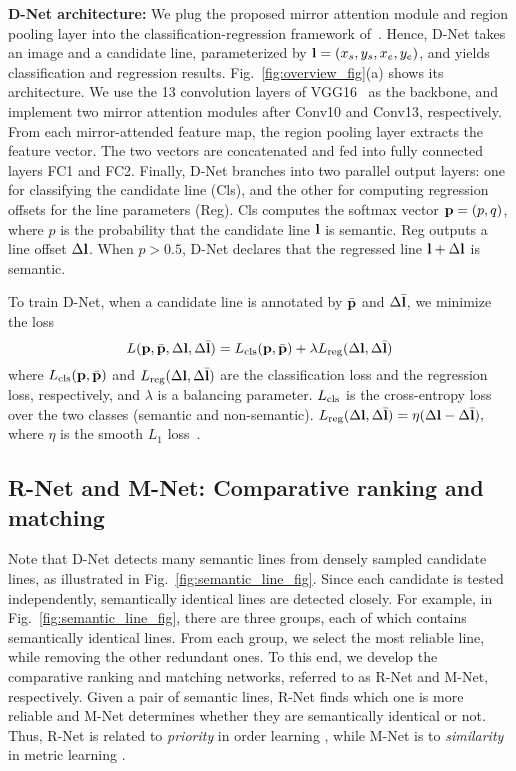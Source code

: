 \documentclass[runningheads]{llncs}
\begin{document}
\noindent\textbf{D-Net architecture:} We plug the proposed mirror attention module and region pooling layer into the classification-regression framework of~\cite{lee2017}. Hence, D-Net takes an image and a candidate line, parameterized by ${\bf l} = (x_s, y_s, x_e, y_e)$, and yields classification and regression results. Fig.~\ref{fig:overview_fig}(a) shows its architecture. We use the 13 convolution layers of VGG16~\cite{Simonyan2015} as the backbone, and implement two mirror attention modules after Conv10 and Conv13, respectively. From each mirror-attended feature map, the region pooling layer extracts the feature vector. The two vectors are concatenated and fed into fully connected layers FC1 and FC2. Finally, D-Net branches into two parallel output layers: one for classifying the candidate line (Cls), and the other for computing regression offsets for the line parameters (Reg). Cls computes the softmax vector ${\bf p} = (p, q)$, where $p$ is the probability that the candidate line ${\bf l}$ is semantic. Reg outputs a line offset $\Delta{\bf l}$. When $p > 0.5$, D-Net declares that the regressed line ${\bf l} + {\Delta\bf l}$ is semantic.

To train D-Net, when a candidate line is annotated by $\bar{\bf p}$ and $\Delta \bar{\bf l}$, we minimize the loss
\begin{equation}\label{loss_all}
   L({\bf p}, \bar{\bf p}, \Delta {\bf l},  \Delta \bar{\bf l}) = L_{\rm cls}({\bf p}, \bar{\bf p}) + \lambda L_{\rm reg}(\Delta {\bf l}, \Delta \bar{\bf l})
\end{equation}
where $L_{\rm cls}({\bf p}, \bar{\bf p})$ and $L_{\rm reg}(\Delta {\bf l},  \Delta \bar{\bf l})$ are the classification loss and the regression loss, respectively, and $\lambda$ is a balancing parameter. $L_{\rm cls}$ is the cross-entropy loss over the two classes (semantic and non-semantic). $L_{\rm reg}(\Delta {\bf l}, \Delta \bar{\bf l})=\eta(\Delta {\bf l} - \Delta \bar{\bf l}),$ where $\eta$ is the smooth $L_1$ loss~\cite{girshick2015fast}.


\subsection{R-Net and M-Net: Comparative ranking and matching}
\label{ssec:CRM}

Note that D-Net detects many semantic lines from densely sampled candidate lines, as illustrated in Fig.~\ref{fig:semantic_line_fig}. Since each candidate is tested independently, semantically identical lines are detected closely. For example, in Fig.~\ref{fig:semantic_line_fig}, there are three groups, each of which contains semantically identical lines. From each group, we select the most reliable line, while removing the other redundant ones. To this end, we develop the comparative ranking and matching networks, referred to as R-Net and M-Net, respectively. Given a pair of semantic lines, R-Net finds which one is more reliable and M-Net determines whether they are semantically identical or not. Thus, R-Net is related to \textit{priority} in order learning \cite{lim2020}, while M-Net is to \textit{similarity} in metric learning \cite{sohn2016,oh2016}.
\end{document}
